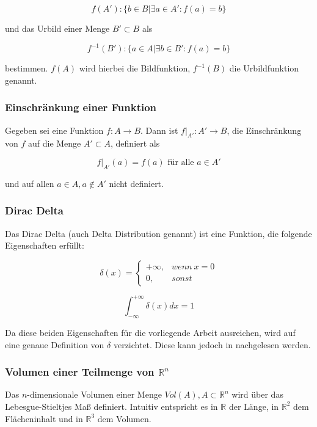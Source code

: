 \documentclass[a4paper,fontsize=12pt,toc=bib,halfparskip]{scrartcl}
\begin{document}
\begin{equation}
	f(A'): \{ b \in B | \exists a \in A' : f(a) = b \}
\end{equation}

und das Urbild einer Menge $B' \subset B$ als

\begin{equation}
	f^{-1}(B'): \{ a \in A | \exists b \in B' : f(a) = b\}
\end{equation}

bestimmen. $f(A)$ wird hierbei die Bildfunktion, $f^{-1}(B)$ die Urbildfunktion genannt. 

\subsubsection{Einschr\"ankung einer Funktion}
Gegeben sei eine Funktion $f: A \rightarrow B$. Dann ist $f|_{A'}: A' \rightarrow B$, die Einschr\"ankung von $f$ auf die Menge $A' \subset A$, definiert als 

\begin{equation}
	f|_{A'}(a) = f(a) \text{ f\"ur alle } a \in A'
\end{equation}

und auf allen $a \in A, a \notin A'$ nicht definiert. 

\subsubsection{Dirac Delta}
Das Dirac Delta (auch Delta Distribution genannt) ist eine Funktion, die folgende Eigenschaften erf\"ullt:

\begin{equation}
	\delta(x)=
	\left\{
	\begin{array}{ll}
		+\infty, & wenn~x = 0\\
		0, & sonst
	\end{array}
	\right.
\end{equation}

\begin{equation}
	\int_{-\infty}^{+\infty}\delta(x)dx = 1
\end{equation}

Da diese beiden Eigenschaften f\"ur die vorliegende Arbeit ausreichen, wird auf eine genaue Definition von $\delta$ verzichtet. Diese kann jedoch in \cite[S.~100~ff.]{kusse2010mathematical} nachgelesen werden.


\subsubsection{Volumen einer Teilmenge von \texorpdfstring{$\mathbb{R}^n$}{}}
Das $n$-dimensionale Volumen einer Menge $Vol(A), A \subset \mathbb{R}^n$ wird \"uber das Lebesgue-Stieltjes Ma{\ss} definiert\cite{kusolitsch2014mass}. Intuitiv entspricht es in $\mathbb{R}$ der L\"ange, in $\mathbb{R}^2$ dem Fl\"acheninhalt und in $\mathbb{R}^3$ dem Volumen.
\end{document}
